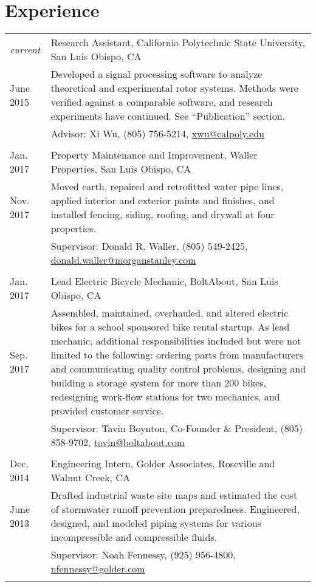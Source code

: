 \documentclass[10pt]{article} %
\newcommand{\catspace}{-.5em}
\begin{document}
\section{Experience}

	\begin{tabular}{p{.6in}|p{5.5in}}
		\emph{current}& Research Assistant, California Polytechnic State University, San Luis Obispo, CA \\
		June 2015& \footnotesize{Developed a signal processing software to analyze theoretical and experimental rotor systems. Methods were verified against a comparable software, and research experiments have continued. See ``Publication'' section.}\\[.5em]
		&\footnotesize{\hfill Advisor: Xi Wu, (805) 756-5214, \href{mailto:xwu@calpoly.edu}{xwu@calpoly.edu}}\\
		\multicolumn{2}{c}{} \\	[\catspace]	
		
		Jan. 2017& Property Maintenance and Improvement, Waller Properties, San Luis Obispo, CA\\
		Nov. 2017& \footnotesize{Moved earth, repaired and retrofitted water pipe lines, applied interior and exterior paints and finishes, and installed fencing, siding, roofing, and drywall at four properties.}\\[.5em]
		&\footnotesize{ \hfill Supervisor: Donald R. Waller, (805) 549-2425, \href{mailto:donald.waller@morganstanley.com}{donald.waller@morganstanley.com}}\\
		\multicolumn{2}{c}{} \\[\catspace]
		Jan. 2017& Lead Electric Bicycle Mechanic, BoltAbout, San Luis Obispo, CA\\
		Sep. 2017& \footnotesize{Assembled, maintained, overhauled, and altered electric bikes for a school sponsored bike rental startup. As lead mechanic, additional responsibilities included but were not limited to the following: ordering parts from manufacturers and communicating quality control problems, designing and building a storage system for more than 200 bikes, redesigning work-flow stations for two mechanics, and provided customer service.}\\[.5em]
		& \footnotesize{\hfill Supervisor: Tavin Boynton, Co-Founder \& President, (805) 858-9702, \href{mailto:tavin@boltabout.com}{tavin@boltabout.com}}\\
		\multicolumn{2}{c}{} \\[\catspace]
		
		Dec. 2014& Engineering Intern, Golder Associates, Roseville and Walnut Creek, CA \\
		June 2013&\footnotesize{ Drafted industrial waste site maps and estimated the cost of stormwater runoff prevention preparedness. Engineered, designed, and modeled piping systems for various incompressible and compressible fluids. }\\[.5em]
		&\footnotesize{\hfill Supervisor: Noah Fennessy, (925) 956-4800, \href{nfennessy@golder.com}{nfennessy@golder.com}}\\
		\multicolumn{2}{c}{} \\	[\catspace]	
		

\end{tabular}
\end{document}
